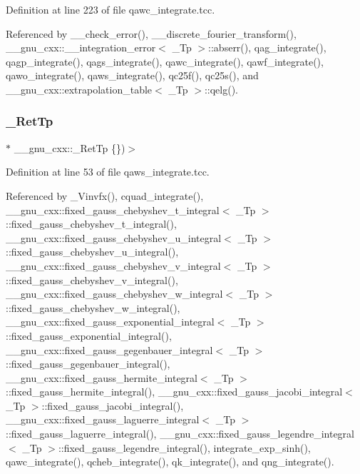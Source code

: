 Definition at line 223 of file qawc\+\_\+integrate.\+tcc.



Referenced by \+\_\+\+\_\+check\+\_\+error(), \+\_\+\+\_\+discrete\+\_\+fourier\+\_\+transform(), \+\_\+\+\_\+gnu\+\_\+cxx\+::\+\_\+\+\_\+integration\+\_\+error$<$ \+\_\+\+Tp $>$\+::abserr(), qag\+\_\+integrate(), qagp\+\_\+integrate(), qags\+\_\+integrate(), qawc\+\_\+integrate(), qawf\+\_\+integrate(), qawo\+\_\+integrate(), qaws\+\_\+integrate(), qc25f(), qc25s(), and \+\_\+\+\_\+gnu\+\_\+cxx\+::extrapolation\+\_\+table$<$ \+\_\+\+Tp $>$\+::qelg().

\mbox{\label{namespace____gnu__cxx_a886e03ece3d53ff7fa6c098a40f93fa5}} 
\subsubsection{\texorpdfstring{\+\_\+\+Ret\+Tp}{\_RetTp}}
{\footnotesize\ttfamily $\ast$ \+\_\+\+\_\+gnu\+\_\+cxx\+::\+\_\+\+Ret\+Tp \{\})$>$}



Definition at line 53 of file qaws\+\_\+integrate.\+tcc.



Referenced by \+\_\+\+Vinvfx(), cquad\+\_\+integrate(), \+\_\+\+\_\+gnu\+\_\+cxx\+::fixed\+\_\+gauss\+\_\+chebyshev\+\_\+t\+\_\+integral$<$ \+\_\+\+Tp $>$\+::fixed\+\_\+gauss\+\_\+chebyshev\+\_\+t\+\_\+integral(), \+\_\+\+\_\+gnu\+\_\+cxx\+::fixed\+\_\+gauss\+\_\+chebyshev\+\_\+u\+\_\+integral$<$ \+\_\+\+Tp $>$\+::fixed\+\_\+gauss\+\_\+chebyshev\+\_\+u\+\_\+integral(), \+\_\+\+\_\+gnu\+\_\+cxx\+::fixed\+\_\+gauss\+\_\+chebyshev\+\_\+v\+\_\+integral$<$ \+\_\+\+Tp $>$\+::fixed\+\_\+gauss\+\_\+chebyshev\+\_\+v\+\_\+integral(), \+\_\+\+\_\+gnu\+\_\+cxx\+::fixed\+\_\+gauss\+\_\+chebyshev\+\_\+w\+\_\+integral$<$ \+\_\+\+Tp $>$\+::fixed\+\_\+gauss\+\_\+chebyshev\+\_\+w\+\_\+integral(), \+\_\+\+\_\+gnu\+\_\+cxx\+::fixed\+\_\+gauss\+\_\+exponential\+\_\+integral$<$ \+\_\+\+Tp $>$\+::fixed\+\_\+gauss\+\_\+exponential\+\_\+integral(), \+\_\+\+\_\+gnu\+\_\+cxx\+::fixed\+\_\+gauss\+\_\+gegenbauer\+\_\+integral$<$ \+\_\+\+Tp $>$\+::fixed\+\_\+gauss\+\_\+gegenbauer\+\_\+integral(), \+\_\+\+\_\+gnu\+\_\+cxx\+::fixed\+\_\+gauss\+\_\+hermite\+\_\+integral$<$ \+\_\+\+Tp $>$\+::fixed\+\_\+gauss\+\_\+hermite\+\_\+integral(), \+\_\+\+\_\+gnu\+\_\+cxx\+::fixed\+\_\+gauss\+\_\+jacobi\+\_\+integral$<$ \+\_\+\+Tp $>$\+::fixed\+\_\+gauss\+\_\+jacobi\+\_\+integral(), \+\_\+\+\_\+gnu\+\_\+cxx\+::fixed\+\_\+gauss\+\_\+laguerre\+\_\+integral$<$ \+\_\+\+Tp $>$\+::fixed\+\_\+gauss\+\_\+laguerre\+\_\+integral(), \+\_\+\+\_\+gnu\+\_\+cxx\+::fixed\+\_\+gauss\+\_\+legendre\+\_\+integral$<$ \+\_\+\+Tp $>$\+::fixed\+\_\+gauss\+\_\+legendre\+\_\+integral(), integrate\+\_\+exp\+\_\+sinh(), qawc\+\_\+integrate(), qcheb\+\_\+integrate(), qk\+\_\+integrate(), and qng\+\_\+integrate().

